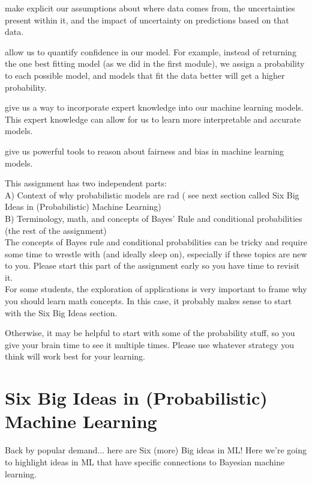 \documentclass[assignment01_Solutions]{subfiles}
\begin{document}
\bi
\item make explicit our assumptions about where data comes from, the uncertainties present within it, and the impact of uncertainty on predictions based on that data.
\item allow us to quantify confidence in our model.  For example, instead of returning the one best fitting model (as we did in the first module), we assign a probability to each possible model, and models that fit the data better will get a higher probability.
\item give us a way to incorporate expert knowledge into our machine learning models.  This expert knowledge can allow for us to learn more interpretable and accurate models.
\item give us powerful tools to reason about fairness and bias in machine learning models.
\ei

\begin{notice}
This assignment has two independent parts:\\

A) Context of why probabilistic models are rad ( see next section called Six Big Ideas in (Probabilistic) Machine Learning)\\

B) Terminology, math, and concepts of Bayes' Rule and conditional probabilities (the rest of the assignment)\\

The concepts of Bayes rule and conditional probabilities can be tricky and require some time to wrestle with (and ideally sleep on), especially if these topics are new to you. Please start this part of the assignment early so you have time to revisit it.\\

For some students, the exploration of applications is very important to frame why you should learn math concepts. In this case, it probably makes sense to start with the Six Big Ideas section.

Otherwise, it may be helpful to start with some of the probability stuff, so you give your brain time to see it multiple times.  Please use whatever strategy you think will work best for your learning.

\end{notice}


\section{Six Big Ideas in (Probabilistic) Machine Learning}
Back by popular demand... here are Six (more) Big ideas in ML!  Here we're going to highlight ideas in ML that have specific connections to Bayesian machine learning.
\end{document}
